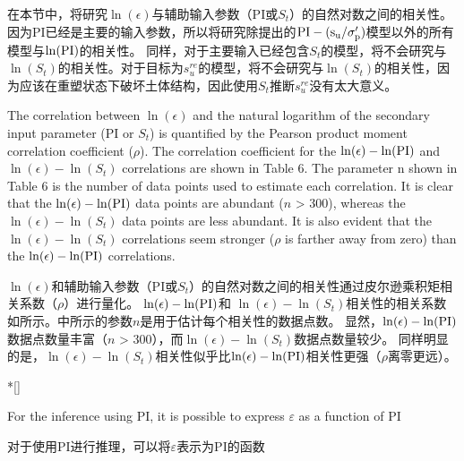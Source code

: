 \begin{paracol}{2}
    在本节中，将研究$\ln(\epsilon)$与辅助输入参数（PI或$S_t$）的自然对数之间的相关性。 因为PI已经是主要的输入参数，所以将研究除\citet{Mesri1975409, Mesri1989162}提出的$\rm{PI}-(s_u/\sigma_p')$模型以外的所有模型与$\ln(\rm{PI})$的相关性。 同样，对于主要输入已经包含$S_t$的模型，将不会研究与$\ln(S_t)$的相关性。对于目标为$s_u^{re}$的模型，将不会研究与$\ln(S_t)$的相关性，因为应该在重塑状态下破坏土体结构，因此使用$S_t$推断$s_u^{re}$没有太大意义。

    \switchcolumn*

    The correlation between $\ln(\epsilon)$ and the natural logarithm of the secondary input parameter (PI or $S_t$) is quantified by the Pearson product moment correlation coefficient ($\rho$). The correlation coefficient for the $\ln(\epsilon)-\ln(\rm{PI})$ and $\ln(\epsilon)-\ln(S_t)$ correlations are shown in Table 6. The parameter n shown in Table 6 is the number of data points used to estimate each correlation. It is clear that the $\ln(\epsilon)-\ln(\rm{PI})$ data points are abundant ($n$ > 300), whereas the $\ln(\epsilon)-\ln(S_t)$ data points are less abundant. It is also evident that the $\ln(\epsilon)-\ln(S_t)$ correlations seem stronger ($\rho$ is farther away from zero) than the $\ln(\epsilon)-\ln(\rm{PI})$ correlations.

    \switchcolumn

    $\ln(\epsilon)$和辅助输入参数（PI或$S_t$）的自然对数之间的相关性通过皮尔逊乘积矩相关系数（$\rho$）进行量化。 $\ln(\epsilon)-\ln(\rm{PI})$和 $\ln(\epsilon)-\ln(S_t)$相关性的相关系数如所示。中所示的参数$n$是用于估计每个相关性的数据点数。 显然，$\ln(\epsilon)-\ln(\rm{PI})$数据点数量丰富（$n$ > 300），而$\ln(\epsilon)-\ln(S_t)$数据点数量较少。 同样明显的是，$\ln(\epsilon)-\ln(S_t)$相关性似乎比$\ln(\epsilon)-\ln(\rm{PI})$相关性更强（$\rho$离零更远）。
\end{paracol}



\begin{paracol}{2}
    \switchcolumn[0]*[]

    For the inference using PI, it is possible to express $\varepsilon$ as a function of PI

    \switchcolumn

    对于使用PI进行推理，可以将$\varepsilon$表示为PI的函数
\end{paracol}

